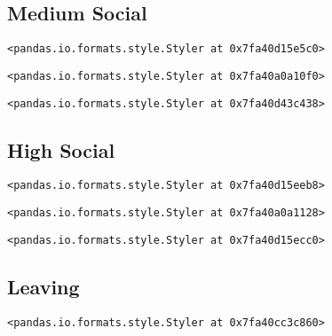 \documentclass[11pt]{article}
\begin{document}
    
    \hypertarget{medium-social}{%
\subsection{\texorpdfstring{\textbf{Medium
Social}}{Medium Social}}\label{medium-social}}

    
    
    \begin{verbatim}
<pandas.io.formats.style.Styler at 0x7fa40d15e5c0>
    \end{verbatim}

    
    
    \begin{verbatim}
<pandas.io.formats.style.Styler at 0x7fa40a0a10f0>
    \end{verbatim}

    
    
    \begin{verbatim}
<pandas.io.formats.style.Styler at 0x7fa40d43c438>
    \end{verbatim}

    
    \hypertarget{high-social}{%
\subsection{\texorpdfstring{\textbf{High
Social}}{High Social}}\label{high-social}}

    
    
    \begin{verbatim}
<pandas.io.formats.style.Styler at 0x7fa40d15eeb8>
    \end{verbatim}

    
    
    \begin{verbatim}
<pandas.io.formats.style.Styler at 0x7fa40a0a1128>
    \end{verbatim}

    
    
    \begin{verbatim}
<pandas.io.formats.style.Styler at 0x7fa40d15ecc0>
    \end{verbatim}

    
    \hypertarget{leaving}{%
\subsection{\texorpdfstring{\textbf{Leaving}}{Leaving}}\label{leaving}}

    
    
    \begin{verbatim}
<pandas.io.formats.style.Styler at 0x7fa40cc3c860>
    \end{verbatim}
\end{document}
